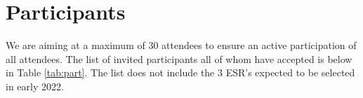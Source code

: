 \section{Participants}

We are aiming at a maximum of 30 attendees to ensure an active
participation of all attendees. The list of invited participants all
of whom have accepted is below in Table \ref{tab:part}. The list does
not include the 3 ESR's expected to be selected in early 2022.




